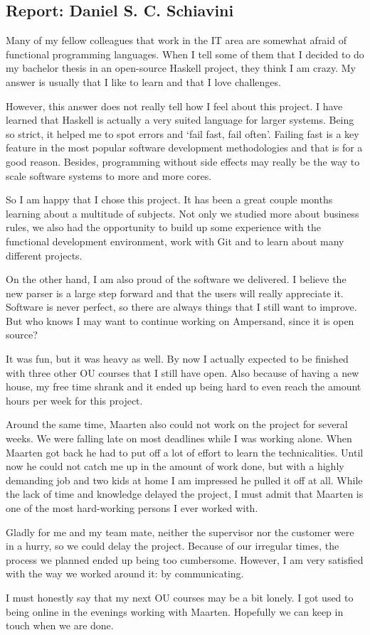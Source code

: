 
\subsection{Report: Daniel S. C. Schiavini}
\label{subsec:assessment-daniel}
Many of my fellow colleagues that work in the IT area are somewhat afraid of functional programming languages.
When I tell some of them that I decided to do my bachelor thesis in an open-source Haskell project, they think I am crazy.
My answer is usually that I like to learn and that I love challenges.

However, this answer does not really tell how I feel about this project.
I have learned that Haskell is actually a very suited language for larger systems.
Being so strict, it helped me to spot errors and `fail fast, fail often'.
Failing fast is a key feature in the most popular software development methodologies and that is for a good reason.
Besides, programming without side effects may really be the way to scale software systems to more and more cores.

So I am happy that I chose this project.
It has been a great couple months learning about a multitude of subjects.
Not only we studied more about business rules, we also had the opportunity to build up some experience with the functional development environment, work with Git and to learn about many different projects.

On the other hand, I am also proud of the software we delivered.
I believe the new parser is a large step forward and that the users will really appreciate it.
Software is never perfect, so there are always things that I still want to improve.
But who knows I may want to continue working on Ampersand, since it is open source?

It was fun, but it was heavy as well.
By now I actually expected to be finished with three other OU courses that I still have open.
Also because of having a new house, my free time shrank and it ended up being hard to even reach the amount hours per week for this project.

Around the same time, Maarten also could not work on the project for several weeks.
We were falling late on most deadlines while I was working alone.
When Maarten got back he had to put off a lot of effort to learn the technicalities.
Until now he could not catch me up in the amount of work done, but with a highly demanding job and two kids at home I am impressed he pulled it off at all.
While the lack of time and knowledge delayed the project, I must admit that Maarten is one of the most hard-working persons I ever worked with.

Gladly for me and my team mate, neither the supervisor nor the customer were in a hurry, so we could delay the project.
Because of our irregular times, the process we planned ended up being too cumbersome.
However, I am very satisfied with the way we worked around it: by communicating.

I must honestly say that my next OU courses may be a bit lonely.
I got used to being online in the evenings working with Maarten.
Hopefully we can keep in touch when we are done.
